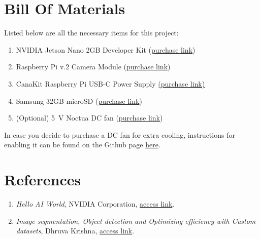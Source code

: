 \documentclass[letter, 12pt]{article}
\begin{document}
	\newpage
	\section{Bill Of Materials}
	\noindent Listed below are all the necessary items for this project:
	\begin{enumerate}
		\item NVIDIA Jetson Nano 2GB Developer Kit (\href{https://www.amazon.com/gp/product/B08J157LHH/ref=ppx_yo_dt_b_asin_title_o03_s00?ie=UTF8&psc=1}{purchase link})
		\item Raspberry Pi v.2 Camera Module (\href{https://www.amazon.com/gp/product/B01ER2SKFS/ref=ppx_yo_dt_b_asin_title_o03_s00?ie=UTF8&psc=1}{purchase link})
		\item CanaKit Raspberry Pi USB-C Power Supply \href{https://www.amazon.com/CanaKit-Raspberry-Power-Supply-USB-C/dp/B07TYQRXTK/ref=sr_1_4?crid=2DKOJXC3JNR55&dchild=1&keywords=raspberry+pi+power+supply&qid=1623127404&sprefix=raspberry+pi+power+%2Caps%2C230&sr=8-4}{(purchase link)}
		\item Samsung 32GB microSD (\href{https://www.amazon.com/Samsung-MicroSDHC-Adapter-MB-ME32GA-AM/dp/B06XWN9Q99/ref=sr_1_3?dchild=1&keywords=samsung+micro+sd+card+32gb&qid=1623127502&sr=8-3}{purchase link})
		\item (Optional) 5~V Noctua DC fan (\href{https://www.amazon.com/Noctua-NF-A4x20-5V-PWM-Premium-Quality/dp/B071FNHVXN/ref=sr_1_14?dchild=1&keywords=Jetson+Nano+fan&qid=1623127615&sr=8-14}{purchase link})
	\end{enumerate}
	\noindent In case you decide to purchase a DC fan for extra cooling, instructions for enabling it can be found on the Github page \href{https://github.com/Pyrestone/jetson-fan-ctl}{here}.
	
	\newpage
	\section{References}
	\begin{enumerate}
		\item \textit{Hello AI World}, NVIDIA Corporation, \href{https://github.com/dusty-nv/jetson-inference}{access link}.
		\item \textit{Image segmentation, Object detection and Optimizing efficiency with Custom datasets}, Dhruva Krishna, \href{https://sfsu.box.com/s/7sculhqpedx7zvrq7k60w97uwzy7r0gu}{access link}.
	\end{enumerate}
\end{document}

